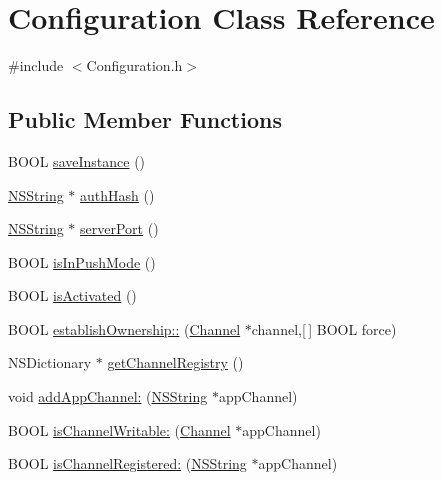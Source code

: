 \hypertarget{interface_configuration}{
\section{\-Configuration \-Class \-Reference}
\label{interface_configuration}
}


{\ttfamily \#include $<$\-Configuration.\-h$>$}

\subsection*{\-Public \-Member \-Functions}
\begin{DoxyCompactItemize}
\item 
\-B\-O\-O\-L \hyperlink{interface_configuration_a7b324d3fea494b260da6d774acc9d2d9}{save\-Instance} ()
\item 
\hyperlink{class_n_s_string}{\-N\-S\-String} $\ast$ \hyperlink{interface_configuration_a428a8a5436830caf8a7037bd56e885b7}{auth\-Hash} ()
\item 
\hyperlink{class_n_s_string}{\-N\-S\-String} $\ast$ \hyperlink{interface_configuration_ac03256ca40f4ddabe04e0fa59a0c5cd1}{server\-Port} ()
\item 
\-B\-O\-O\-L \hyperlink{interface_configuration_ab164cd44c779f937c2e4f58bd9afc58c}{is\-In\-Push\-Mode} ()
\item 
\-B\-O\-O\-L \hyperlink{interface_configuration_a8e2c52e56f93e780dc65b2f27d6d2898}{is\-Activated} ()
\item 
\-B\-O\-O\-L \hyperlink{interface_configuration_a042798cb371b1e2f5a5bc56222bd66f1}{establish\-Ownership\-::} (\hyperlink{interface_channel}{\-Channel} $\ast$channel,\mbox{[}$\,$\mbox{]} \-B\-O\-O\-L force)
\item 
\-N\-S\-Dictionary $\ast$ \hyperlink{interface_configuration_aef095a42f68f9b9f684dd6e5e89d8eef}{get\-Channel\-Registry} ()
\item 
void \hyperlink{interface_configuration_a25bf46b6993ec0f082b7825fb5687095}{add\-App\-Channel\-:} (\hyperlink{class_n_s_string}{\-N\-S\-String} $\ast$app\-Channel)
\item 
\-B\-O\-O\-L \hyperlink{interface_configuration_a542a733714b57631b04eae33aef00e4c}{is\-Channel\-Writable\-:} (\hyperlink{interface_channel}{\-Channel} $\ast$app\-Channel)
\item 
\-B\-O\-O\-L \hyperlink{interface_configuration_ac618686ff2d1745b70a8ae44046a04ee}{is\-Channel\-Registered\-:} (\hyperlink{class_n_s_string}{\-N\-S\-String} $\ast$app\-Channel)
\end{DoxyCompactItemize}
